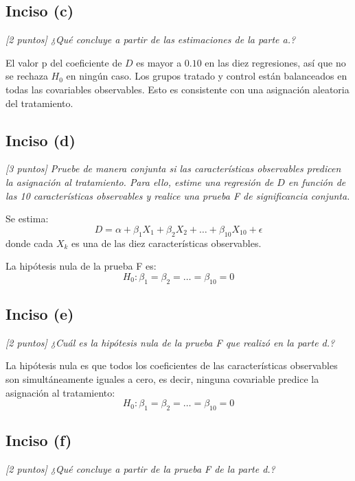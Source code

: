 \documentclass[12pt]{article}
\begin{document}
\subsection*{Inciso (c)}

\textit{[2 puntos] ¿Qué concluye a partir de las estimaciones de la parte a.?}

El valor p del coeficiente de $D$ es mayor a $0.10$ en las diez regresiones, así que no se rechaza $H_0$ en ningún caso. Los grupos tratado y control están balanceados en todas las covariables observables. Esto es consistente con una asignación aleatoria del tratamiento.

\subsection*{Inciso (d)}

\textit{[3 puntos] Pruebe de manera conjunta si las características observables predicen la asignación al tratamiento. Para ello, estime una regresión de $D$ en función de las 10 características observables y realice una prueba F de significancia conjunta.}

Se estima:
\begin{equation}
D = \alpha + \beta_1 X_1 + \beta_2 X_2 + \dots + \beta_{10} X_{10} + \epsilon
\end{equation}
donde cada $X_k$ es una de las diez características observables.

La hipótesis nula de la prueba F es:
\[
H_0: \beta_1 = \beta_2 = \dots = \beta_{10} = 0
\]



\subsection*{Inciso (e)}

\textit{[2 puntos] ¿Cuál es la hipótesis nula de la prueba F que realizó en la parte d.?}

La hipótesis nula es que todos los coeficientes de las características observables son simultáneamente iguales a cero, es decir, ninguna covariable predice la asignación al tratamiento:
\[
H_0: \beta_1 = \beta_2 = \dots = \beta_{10} = 0
\]

\subsection*{Inciso (f)}

\textit{[2 puntos] ¿Qué concluye a partir de la prueba F de la parte d.?}
\end{document}
